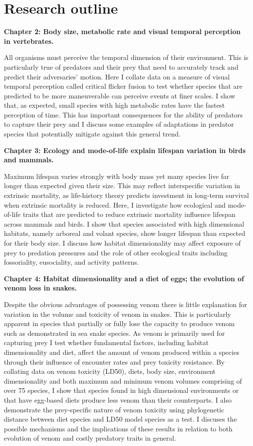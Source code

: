 \section{\uppercase{R}esearch outline}


\textbf{Chapter 2: Body size, metabolic rate and visual temporal perception in vertebrates.}

 All organisms must perceive the temporal dimension of their environment. This is particularly true of predators and their prey that need to accurately track and predict their adversaries' motion. Here I collate data on a measure of visual temporal perception called critical flicker fusion to test whether species that are predicted to be more maneuverable can perceive events at finer scales. I show that, as expected, small species with high metabolic rates have the fastest perception of time. This has important consequences for the ability of predators to capture their prey and I discuss some examples of adaptations in predator species that potentially mitigate against this general trend. 


\textbf{Chapter 3: Ecology and mode-of-life explain lifespan variation in birds and mammals.}

Maximum lifespan varies strongly with body mass yet many species live far longer than expected given their size. This may reflect interspecific variation in extrinsic mortality, as life-history theory predicts investment in long-term survival when extrinsic mortality is reduced. Here, I investigate how ecological and mode-of-life traits that are predicted to reduce extrinsic mortality influence lifespan across mammals and birds. I show that species associated with high dimensional habitats, namely arboreal and volant species, show longer lifespan than expected for their body size. I discuss how habitat dimensionality may affect exposure of prey to predation pressures and the role of other ecological traits including fossoriality, eusociality, and activity patterns.


\textbf{Chapter 4: Habitat dimensionality and a diet of eggs; the evolution of venom loss in snakes.}

Despite the obvious advantages of possessing venom there is little explanation for variation in the volume and toxicity of venom in snakes. This is particularly apparent in species that partially or fully lose the capacity to produce venom such as demonstrated in sea snake species. As venom is primarily used for capturing prey I test whether fundamental factors, including habitat dimensionality and diet, affect the amount of venom produced within a species through their influence of encounter rates and prey toxicity resistance. By collating data on venom toxicity (LD50), diets, body size, environment dimensionality and both maximum and minimum venom volumes comprising of over 75 species, I show that species found in high dimensional environments or that have egg-based diets produce less venom than their counterparts. I also demonstrate the prey-specific nature of venom toxicity using phylogenetic distance between diet species and LD50 model species as a test. I discuses the possible mechanisms and the implications of these results in relation to both evolution of venom and costly predatory traits in general.

